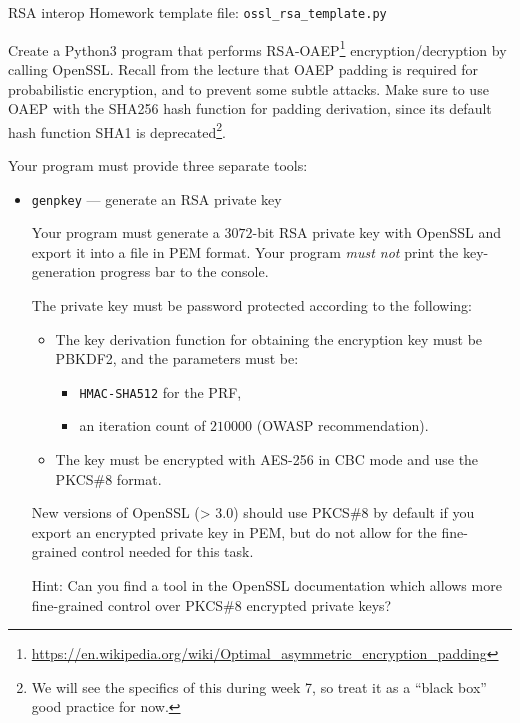 \documentclass{homework}
\begin{document}
\begin{task}{RSA interop}
  Homework template file: \texttt{ossl\_rsa\_template.py}

  Create a Python3 program that performs RSA-OAEP\footnote{\url{https://en.wikipedia.org/wiki/Optimal_asymmetric_encryption_padding}} encryption/decryption by calling OpenSSL.
  Recall from the lecture that OAEP padding is required for probabilistic encryption, and to prevent some subtle attacks.
  Make sure to use OAEP with the SHA256 hash function for padding derivation, since its default hash function SHA1 is deprecated\footnote{We will see the specifics of this during week 7, so treat it as a \enquote{black box} good practice for now.}.

  \newpage

  Your program must provide three separate tools:
  \begin{itemize}
    \item \texttt{genpkey} --- generate an RSA private key

    Your program must generate a $3072$-bit RSA private key with OpenSSL and export it into a file in PEM format.
    Your program \emph{must not} print the key-generation progress bar to the console.

    The private key must be password protected according to the following:
    \begin{itemize}
      \item The key derivation function for obtaining the encryption key must be PBKDF2, and the parameters must be:
      \begin{itemize}
        \item \texttt{HMAC-SHA512} for the PRF,
        \item an iteration count of $210000$ (OWASP recommendation).
      \end{itemize}
      \item The key must be encrypted with AES-256 in CBC mode and use the PKCS\#8 format.
    \end{itemize}

    \begin{tcolorbox}[title=Note]
      New versions of OpenSSL (> 3.0) should use PKCS\#8 by default if you export an encrypted private key in PEM, but do not allow for the fine-grained control needed for this task.

      Hint: Can you find a tool in the OpenSSL documentation which allows more fine-grained control over PKCS\#8 encrypted private keys? 
    \end{tcolorbox}


\end{itemize}
\end{task}
\end{document}
